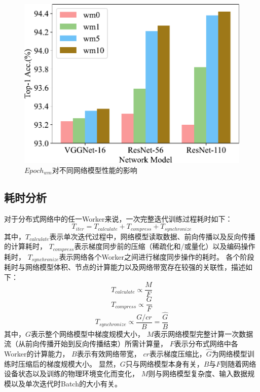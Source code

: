 \documentclass{xdupgthesis}
\begin{document}
\begin{figure}[ht]
    \centering
    \includegraphics[width=0.65\linewidth]{epoch_wm_chap-4-2.pdf}
    \caption{$Epoch_{wm}$对不同网络模型性能的影响}
    \label{fig_Result-Epoch-wm}
\end{figure}

\subsection{耗时分析}
对于分布式网络中的任一Worker来说，一次完整迭代训练过程耗时如下：
\begin{equation}
    T_{iter} = 
        T_{calculate} + T_{compress} + T_{synchronize}
    \label{eq_Time-iter}
\end{equation}
其中，$T_{calculate}$表示单次迭代过程中，网络模型读取数据、前向传播以及反向传播的计算耗时，
$T_{compress}$表示梯度同步前的压缩（稀疏化和/或量化）以及编码操作耗时，
$T_{synchronize}$表示网络各个Worker之间进行梯度同步操作的耗时。
各个阶段耗时与网络模型体积、节点的计算能力以及网络带宽存在较强的关联性，描述如下：
\begin{equation}
    T_{calculate} \propto \frac{M}{F}
\end{equation}
\begin{equation}
    T_{compress} \propto \frac{G}{F}
\end{equation}
\begin{equation}
    T_{synchronize} \propto \frac{G/cr}{B} = \frac{\hat{G}}{B}
\end{equation}
其中，$G$表示整个网络模型中梯度规模大小，
$M$表示网络模型完整计算一次数据流（从前向传播开始到反向传播结束）所需计算量，
$F$表示分布式网络中各Worker的计算能力，
$B$表示有效网络带宽，
$cr$表示梯度压缩比，$\hat{G}$为网络模型训练时压缩后的梯度规模大小。
显然，$G$只与网络模型本身有关，$B$与$F$则随着网络设备状态以及训练的物理环境变化而变化，
$M$则与网络模型复杂度、输入数据规模以及单次迭代时Batch的大小有关。
\end{document}
